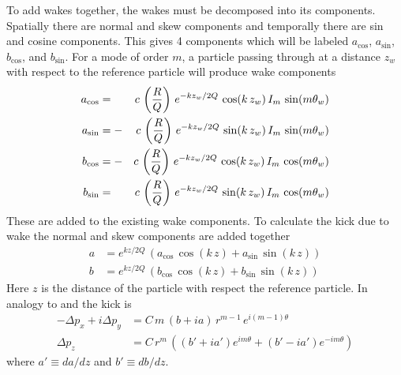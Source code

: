 To add wakes together, the wakes must be decomposed into its
components.  Spatially there are normal and skew components and
temporally there are sin and cosine components. This gives 4
components which will be labeled $a_{\cos}$, $a_{\sin}$, $b_{\cos}$,
and $b_{\sin}$. For a mode of order $m$, a particle passing through at
a distance $z_w$ with respect to the reference particle will produce
wake components
\begin{alignat}{2}
  a_{\cos} &=  &c \, \left( \frac{R}{Q} \right) \,
    e^{-k z_w/ 2 Q} \, \cos (k \, z_w) \, I_m \, \sin(m \theta_w) \nonumber \\
  a_{\sin} &= -&c \, \left( \frac{R}{Q} \right) \,
    e^{-k z_w/ 2 Q} \, \sin (k \, z_w) \, I_m \, \sin(m \theta_w) 
    \label{ac2rq} \\
  b_{\cos} &= -&c \, \left( \frac{R}{Q} \right) \,
    e^{-k z_w/ 2 Q} \, \cos (k \, z_w) \, I_m \, \cos(m \theta_w) \nonumber \\
  b_{\sin} &=  &c \, \left( \frac{R}{Q} \right) \,
    e^{-k z_w/ 2 Q} \, \sin (k \, z_w) \, I_m \, \cos(m \theta_w) \nonumber
\end{alignat}
These are added to the existing wake components. To calculate the kick
due to wake the normal and skew components are added together
\begin{align}
  a &= e^{k z/ 2 Q} \, \left( 
    a_{\cos} \, \cos (k \, z) + a_{\sin} \, \sin (k \, z) \right) 
    \label{akz2q} \\
  b &= e^{k z/ 2 Q} \, \left(
    b_{\cos} \, \cos (k \, z) + b_{\sin} \, \sin (k \, z) \right) \nonumber 
\end{align}
Here $z$ is the distance of the particle with respect the
reference particle. In analogy to  and  the kick
is
\begin{align}
  -\Delta p_x + i\Delta p_y &= C \, 
    m \, (b + i a) \, r^{m-1} \, e^{i (m-1) \theta} 
    \label{ppcmbar} \\
  \Delta p_z &= C \, r^m \, \left( 
    (b' + i a') e^{i m\theta} + (b' - i a') e^{-i m\theta} \right)
\end{align}
where $a' \equiv da/dz$ and $b' \equiv db/dz$.

